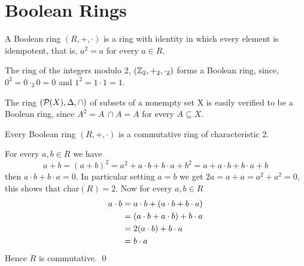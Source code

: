 \section{Boolean Rings}

\begin{mydef}
    A Boolean ring \((R, +, \cdot)\) is a ring with identity in which every element is idempotent, that is, \(a^2=a\) for every \(a \in R\).
\end{mydef}

\begin{example}
  The ring  of the integers modulo 2, \((\mathbb{Z}_2,+_2,\cdot_2)\) forms a Boolean ring, since, \(0^2=0\cdot_2 0=0\) and \(1^2=1\cdot 1=1\).
\end{example}

\begin{example}
    The ring \((\mathcal{P}(X),\Delta,\cap)\) of subsets of a nonempty set X is easily verified to be a Boolean ring, since 
    \(A^2=A\ \cap A=A\) for every \(A\subseteq X\).
\end{example}


\begin{theo}
    Every Boolean ring \((R,+,\cdot)\) is a commutative ring of characteristic \(2\).
\end{theo}
\begin{myproof}
For every \(a,b\in R\) we have
\[
a+b=(a+b)^2=a^2+a\cdot b+b\cdot a+b^2=a+a\cdot b+b\cdot a+b
\]
then \(a\cdot b+b\cdot a=0\). In particular setting \(a=b\) we get
\(2a=a+a=a^2+a^2=0\), this shows that \(\mathrm{char}(R)=2\). Now for every \(a,b\in R\)
\begin{align*}
    a\cdot b&=a\cdot b+(a\cdot b+b\cdot a)\\
    &=(a\cdot b+a\cdot b)+b\cdot a\\
    &=2(a\cdot b)+b\cdot a\\
    &=b\cdot a
\vspace{-5pt}
\end{align*}
Hence \(R\) is commutative. \qed
\end{myproof}

